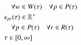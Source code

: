 \begin{alignat}{2}
	& \quad \forall w \in W(\tau) \quad \forall p \in P(\tau)     \label{eqn:x_integrality_constraint}                                                                                                                                                                 \\ 
	& \epsilon_{pr}(\tau) \in \mathbb{R}^{+} \notag                                                                                                                                                                                                                                                            \\ 
	& \quad \forall p \in P(\tau) \quad \forall r \in R(\tau)                           \label{eqn:p_non_negativity_constraint}                                                                                                                                            \\ 
	& \tau \in  [0, \infty] 
\end{alignat}
